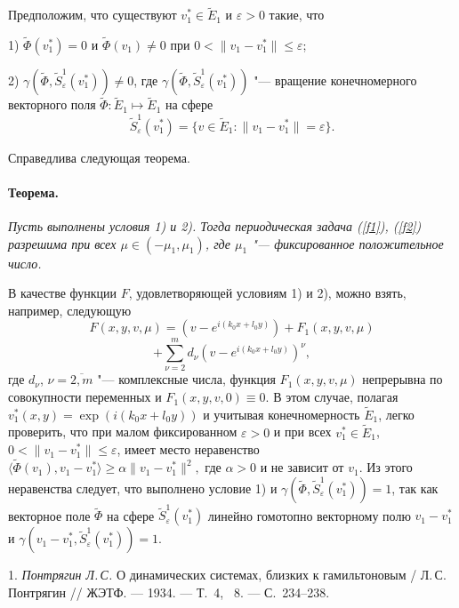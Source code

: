 Предположим, что существуют $v_1^*\in \widetilde{E}_1$ и
$\varepsilon>0$ такие, что

1) $\widetilde{\Phi}(v_1^*)=0$ и $\widetilde{\Phi}(v_1)\neq 0$ при
$0<\|v_1-v_1^*\|\leq\varepsilon$;

2)
$\gamma(\widetilde{\Phi},\widetilde{S}_{\varepsilon}^1(v_1^*))\neq
0$, где
$\gamma(\widetilde{\Phi},\widetilde{S}_{\varepsilon}^1(v_1^*))$ "---
вращение конечномерного векторного поля $\widetilde{\Phi} :
\widetilde{E}_1 \mapsto \widetilde{E}_1$ на сфере
$$
 \widetilde{S}_{\varepsilon}^1(v_1^*)= \{v\in \widetilde{E}_1
: \|v_1-v_1^*\|=\varepsilon\}.
$$

Справедлива следующая теорема.

\paragraph{Теорема.}
{\it
	Пусть выполнены условия 1) и 2). Тогда  периодическая задача
(\ref{f1}), (\ref{f2}) разрешима при всех $\mu\in (-\mu_1 ,
\mu_1)$, где $\mu_1$ "--- фиксированное положительное число.
}

\vspace{0.3 cm}

В качестве функции $F$, удовлетворяющей условиям 1) и 2),
 можно взять, например, следующую
$$
F(x,y,v,\mu)=\left(v-e^{i(k_0x+l_0y)}\right)+ F_1(x,y,v,\mu)
$$
$$
+\sum_{\nu=2}^m
d_{\nu}\left(v-e^{i(k_0x+l_0y)} \right)^{\nu} ,
$$
где $d_{\nu}$, $\nu=\overline{2, m}$ "--- комплексные числа, функция
$F_1(x,y,v,\mu)$ непрерывна по совокупности переменных и
$F_1(x,y,v,0)\equiv 0$. В этом случае, полагая
$v_1^*(x,y)=\exp{(i(k_0x+l_0y))}$ и учитывая конечномерность
$\widetilde{E}_1$, легко проверить, что при малом фиксированном
$\varepsilon>0$ и при всех $v_1^*\in \widetilde{E}_1$,
$0<\|v_1-v_1^*\|\leq\varepsilon$, имеет место неравенство
$
\langle\widetilde{\Phi}(v_1), v_1-v_1^*\rangle  \geq  \alpha
\|v_1-v_1^*\|^2,
$
где $\alpha>0$ и не зависит от $v_1$. Из этого неравенства
следует, что выполнено условие 1) и
$\gamma(\widetilde{\Phi},\widetilde{S}_{\varepsilon}^1(v_1^*))=1$,
так как  векторное поле $\widetilde{\Phi}$ на сфере
$\widetilde{S}_{\varepsilon}^1(v_1^*)$ линейно гомотопно
векторному полю $v_1-v_1^*$ и
$\gamma(v_1-v_1^*,\widetilde{S}_{\varepsilon}^1(v_1^*))=1$.


\vspace{0.3 cm}


\litlist

1. {\it Понтрягин Л.\,С.}
О динамических системах, близких к гамильтоновым  / Л.\,С.
Понтрягин // ЖЭТФ. --- 1934. --- Т.~4, \No~8. --- С.~234--238.

